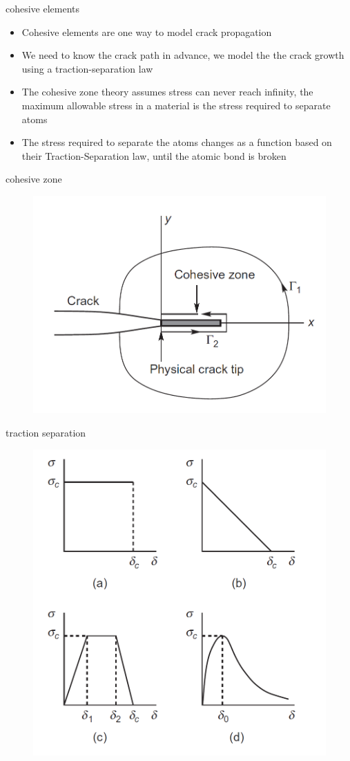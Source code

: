 \documentclass[10pt]{beamer}
\begin{document}
	\begin{frame}{cohesive elements}
		\begin{itemize}[<+->]
			\item Cohesive elements are one way to model crack propagation
			\item We need to know the crack path in advance, we model the the crack growth using a traction-separation law
			\item The cohesive zone theory assumes stress can never reach infinity, the maximum allowable stress in a material is the stress required to separate atoms
			\item The stress required to separate the atoms changes as a function based on their Traction-Separation law, until the atomic bond is broken
		\end{itemize}
	\end{frame}
	
	\begin{frame}{cohesive zone}
		\begin{figure}
		\centering
		\includegraphics[width=0.7\linewidth]{../Figures/cohesive_zone}
		\label{fig:cohesive_zone}
		\end{figure}
	\end{frame}
	
	\begin{frame}{traction separation}
		\begin{figure}
		\centering
		\includegraphics[width=0.7\linewidth]{../Figures/traction_separation}
		\label{fig:traction_separation}
		\end{figure}
	\end{frame}
	
\end{document}
